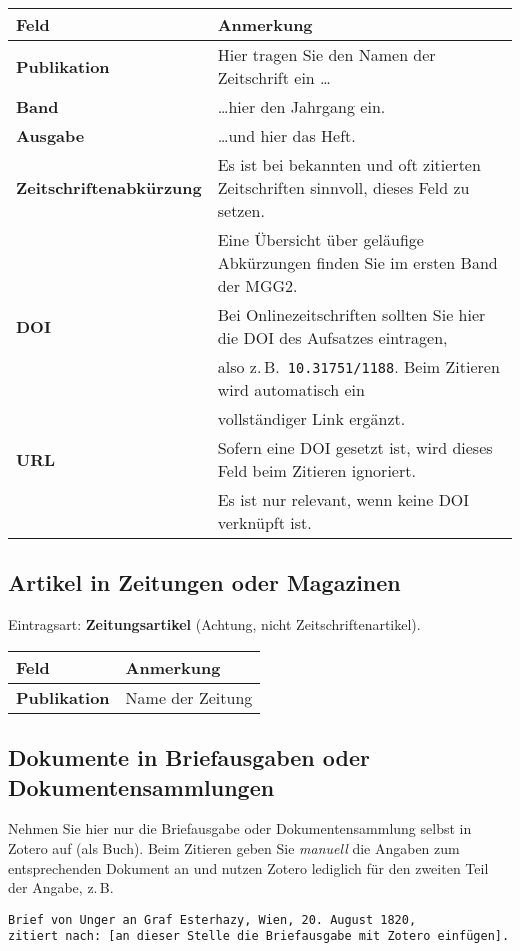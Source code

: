 \begin{center}
\begin{tabular}{ll}
\toprule
\textbf{Feld} & \textbf{Anmerkung}\\
\midrule
\textbf{Publikation} & Hier tragen Sie den Namen der Zeitschrift ein \dots\\
\textbf{Band} & \dots hier den Jahrgang ein.\\
\textbf{Ausgabe} & \dots und hier das Heft.\\
\textbf{Zeitschriftenabk\"urzung} & Es ist bei bekannten und oft zitierten Zeitschriften sinnvoll, dieses Feld zu setzen.\\
 & Eine \"Ubersicht \"uber gel\"aufige Abk\"urzungen finden Sie im ersten Band der MGG2.\\
\textbf{DOI} & Bei Onlinezeitschriften sollten Sie hier die DOI des Aufsatzes eintragen,\\
 & also z.\,B.\ \texttt{10.31751/1188}. Beim Zitieren wird automatisch ein\\
 & vollst\"andiger Link erg\"anzt.\\
\textbf{URL} & Sofern eine DOI gesetzt ist, wird dieses Feld beim Zitieren ignoriert.\\
 & Es ist nur relevant, wenn keine DOI verkn\"upft ist.\\
\bottomrule
\end{tabular}
\end{center}

\subsection{Artikel in Zeitungen oder Magazinen}

Eintragsart: \textbf{Zeitungsartikel} (Achtung, nicht Zeitschriftenartikel).

\begin{center}
\begin{tabular}{ll}
\toprule
\textbf{Feld} & \textbf{Anmerkung}\\
\midrule
\textbf{Publikation} & Name der Zeitung\\
\bottomrule
\end{tabular}
\end{center}

\subsection{Dokumente in Briefausgaben oder Dokumentensammlungen}

Nehmen Sie hier nur die Briefausgabe oder Dokumentensammlung selbst in Zotero auf (als Buch). 
Beim Zitieren geben Sie \emph{manuell} die Angaben zum entsprechenden Dokument an und nutzen Zotero 
lediglich f\"ur den zweiten Teil der Angabe, z.\,B.
\begin{verbatim}
Brief von Unger an Graf Esterhazy, Wien, 20. August 1820,
zitiert nach: [an dieser Stelle die Briefausgabe mit Zotero einfügen].
\end{verbatim}
